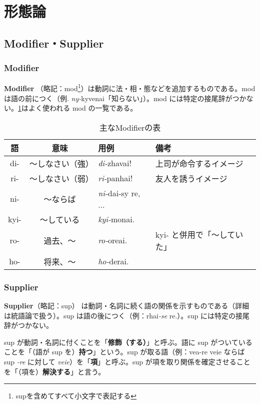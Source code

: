 \section{形態論}

\subsection{Modifier・Supplier}

\subsubsection{Modifier}
\textbf{Modifier} （略記：mod\footnote{supを含めてすべて小文字で表記する}）は動詞に法・相・態などを追加するものである。mod は語の前につく（例. \emph{ny-}kyvenai「知らない」）。mod には特定の接尾辞がつかない。\cref{table:common-mods}はよく使われる mod の一覧である。

\begin{table}[h]
    \centering
    \caption{主なModifierの表}
    \label{table:common-mods}
    \begin{tabular}{ccll}
        \hline
        語 & 意味 & 用例 & 備考 \\
        \hline \hline
        di-  & ～しなさい（強） & \emph{di-}zhavai! & 上司が命令するイメージ \\
        ri-  & ～しなさい（弱） & \emph{ri-}panhai! & 友人を誘うイメージ\\
        ni-  & ～ならば   & \emph{ni-}dai-sy re, ...& \\
        kyi- & ～している & \emph{kyi-}monai. & \\
        ro-  & 過去、～   & \emph{ro-}oreai. & kyi- と併用で「～していた」\\
        ho-  & 将来、～   & \emph{ho-}derai. & \\
        \hline
    \end{tabular}
\end{table}

\subsubsection{Supplier}

\textbf{Supplier}（略記：sup） は動詞・名詞に続く語の関係を示すものである（詳細は統語論で扱う）。sup は語の後につく（例：rhai\emph{-se} re.）。sup には特定の接尾辞がつかない。

sup が動詞・名詞に付くことを「\textbf{修飾（する）}」と呼ぶ。語に sup がついていることを「（語が sup を）\textbf{持つ}」という。sup が取る語（例：vea-re veie ならば sup \emph{-re} に対して \emph{veie}）を「\textbf{項}」と呼ぶ。sup が項を取り関係を確定させることを「（項を）\textbf{解決する}」と言う。

